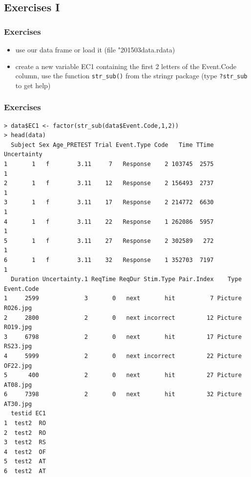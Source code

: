 \documentclass[xcolor={table},c]{beamer}
\begin{document}
\subsection{Exercises I}
\begin{frame}[fragile]\frametitle{Exercises}
  \begin{itemize}
  \item use our data frame or load it (file "201503data.rdata)
  \item create a new variable EC1 containing the first 2 letters of the Event.Code column, use the function \texttt{str\_sub()} from the stringr package (type \texttt{?str\_sub}  to get help)
  \end{itemize}
\end{frame}


\begin{frame}[fragile]\frametitle{Exercises}\tiny
\begin{verbatim}
> data$EC1 <- factor(str_sub(data$Event.Code,1,2))
> head(data)
  Subject Sex Age_PRETEST Trial Event.Type Code   Time TTime Uncertainty
1       1   f        3.11     7   Response    2 103745  2575           1
2       1   f        3.11    12   Response    2 156493  2737           1
3       1   f        3.11    17   Response    2 214772  6630           1
4       1   f        3.11    22   Response    1 262086  5957           1
5       1   f        3.11    27   Response    2 302589   272           1
6       1   f        3.11    32   Response    1 352703  7197           1
  Duration Uncertainty.1 ReqTime ReqDur Stim.Type Pair.Index    Type Event.Code
1     2599             3       0   next       hit          7 Picture   RO26.jpg
2     2800             2       0   next incorrect         12 Picture   RO19.jpg
3     6798             2       0   next       hit         17 Picture   RS23.jpg
4     5999             2       0   next incorrect         22 Picture   OF22.jpg
5      400             2       0   next       hit         27 Picture   AT08.jpg
6     7398             2       0   next       hit         32 Picture   AT30.jpg
  testid EC1
1  test2  RO
2  test2  RO
3  test2  RS
4  test2  OF
5  test2  AT
6  test2  AT
\end{verbatim}
\end{frame}
\end{document}
